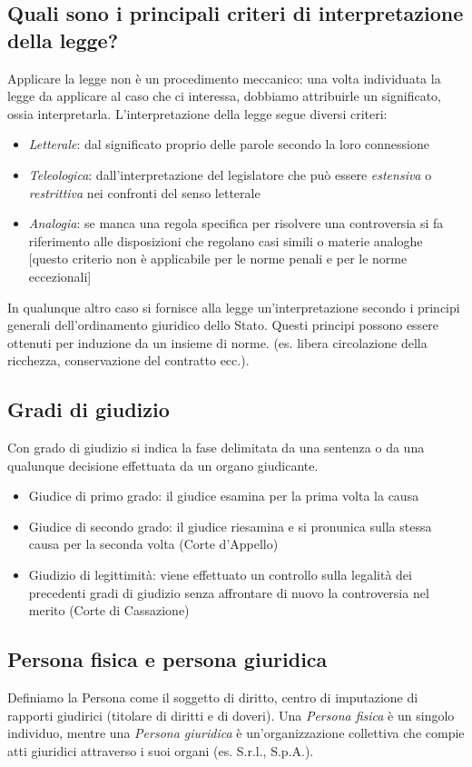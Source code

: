 \subsection{Quali sono i principali criteri di interpretazione della legge?}
Applicare la legge non è un procedimento meccanico: una volta individuata la legge da applicare al caso che 
ci interessa, dobbiamo attribuirle un significato, ossia interpretarla.\newline
L'interpretazione della legge segue diversi criteri:
\begin{itemize}
    \item \emph{Letterale}: dal significato proprio delle parole secondo la loro connessione
    \item \emph{Teleologica}: dall'interpretazione del legislatore che può essere \emph{estensiva} o \emph{restrittiva} nei
    confronti del senso letterale
    \item \emph{Analogia}: se manca una regola specifica per risolvere una controversia si fa riferimento alle disposizioni che
    regolano casi simili o materie analoghe [questo criterio non è applicabile per le norme penali e per 
    le norme eccezionali]
\end{itemize}
In qualunque altro caso si fornisce alla legge un'interpretazione secondo i principi generali
dell'ordinamento giuridico dello Stato. Questi principi possono essere ottenuti per induzione da un insieme di norme.
(es. libera circolazione della ricchezza, conservazione del contratto ecc.).

\subsection{Gradi di giudizio}
Con grado di giudizio si indica la fase delimitata da una sentenza o da una qualunque decisione effettuata da un
organo giudicante.
\begin{itemize}
    \item Giudice di primo grado: il giudice esamina per la prima volta la causa
    \item Giudice di secondo grado: il giudice riesamina e si pronunica sulla stessa causa per la
    seconda volta (Corte d'Appello)
    \item  Giudizio di legittimità: viene effettuato un controllo sulla legalità dei precedenti gradi
    di giudizio senza affrontare di nuovo la controversia nel merito (Corte di Cassazione)
\end{itemize}

\subsection{Persona fisica e persona giuridica}
Definiamo la Persona come il soggetto di diritto, centro di imputazione di rapporti giudirici (titolare di diritti e di doveri).\newline
Una \emph{Persona fisica} è un singolo individuo, mentre una \emph{Persona giuridica} è un'organizzazione collettiva che compie atti giuridici
attraverso i suoi organi (es. S.r.l., S.p.A.).

